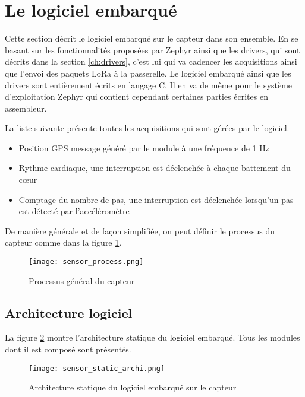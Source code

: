 \section{Le logiciel embarqué}

Cette section décrit le logiciel embarqué sur le capteur dans son ensemble. En se basant sur les fonctionnalités proposées par Zephyr ainsi que les drivers, qui sont décrits dans la section \ref{ch:drivers}, c'est lui qui va cadencer les acquisitions ainsi que l'envoi des paquets LoRa à la passerelle. Le logiciel embarqué ainsi que les drivers sont entièrement écrits en langage C. Il en va de même pour le système d'exploitation Zephyr qui contient cependant certaines parties écrites en assembleur.

La liste suivante présente toutes les acquisitions qui sont gérées par le logiciel.

\begin{itemize}
\item Position GPS message généré par le module à une fréquence de 1 Hz
\item Rythme cardiaque, une interruption est déclenchée à chaque battement du cœur
\item Comptage du nombre de pas, une interruption est déclenchée lorsqu'un pas est détecté par l'accéléromètre
\end{itemize}

De manière générale et de façon simplifiée, on peut définir le processus du capteur comme dans la figure \ref{fig:sensor_process}.

\begin{figure}[htb]
\centering 
\texttt{[image: sensor\_process.png]} 
\caption{Processus général du capteur}
\label{fig:sensor_process}
\end{figure}

\subsection{Architecture logiciel}

La figure \ref{fig:sensor_static_archi} montre l'architecture statique du logiciel embarqué. Tous les modules dont il est composé sont présentés.

\begin{figure}[htb]
\centering 
\texttt{[image: sensor\_static\_archi.png]} 
\caption{Architecture statique du logiciel embarqué sur le capteur}
\label{fig:sensor_static_archi}
\end{figure}

